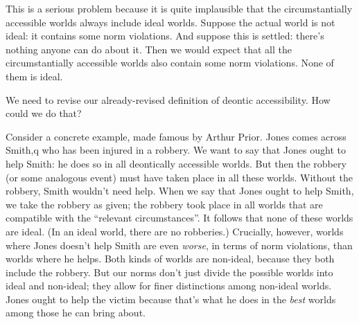 This is a serious problem because it is quite implausible that the
circumstantially accessible worlds always include ideal worlds. Suppose the
actual world is not ideal: it contains some norm violations. And suppose this is
settled: there's nothing anyone can do about it. Then we would expect that
all the circumstantially accessible worlds also contain some norm violations.
None of them is ideal.



We need to revise our already-revised definition of deontic accessibility. How
could we do that?

Consider a concrete example, made famous by Arthur Prior. Jones comes across
Smith,q who has been injured in a robbery. We want to say that Jones ought to
help Smith: he does so in all deontically accessible worlds. But then the
robbery (or some analogous event) must have taken place in all these worlds.
Without the robbery, Smith wouldn't need help. When we say that Jones ought to
help Smith, we take the robbery as given; the robbery took place in all worlds
that are compatible with the ``relevant circumstances''. It follows that none of
these worlds are ideal. (In an ideal world, there are no robberies.) Crucially,
however, worlds where Jones doesn't help Smith are even \emph{worse}, in terms
of norm violations, than worlds where he helps. Both kinds of worlds are
non-ideal, because they both include the robbery. But our norms don't just
divide the possible worlds into ideal and non-ideal; they allow for finer
distinctions among non-ideal worlds. Jones ought to help the victim because
that's what he does in the \emph{best} worlds among those he can bring about.


